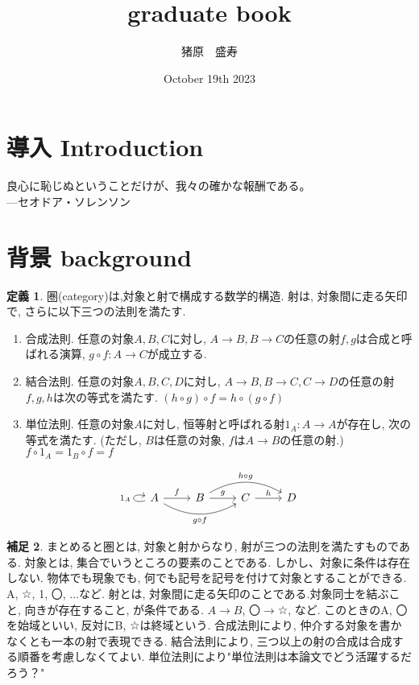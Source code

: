 \documentclass[a4paper]{jsarticle}
\title{graduate book}
\author{猪原　盛寿}
\date{October 19th 2023}
\theoremstyle{definition}
\newtheorem{dfn}{定義}[section]
\newtheorem{hsk}[dfn]{補足}
\begin{document}
\Large
\maketitle

\section{導入 Introduction}
良心に恥じぬということだけが、我々の確かな報酬である。\\
---セオドア・ソレンソン
\section{背景 background}

\begin{dfn}
圏(category)は,対象と射で構成する数学的構造. 射は, 対象間に走る矢印で, さらに以下三つの法則を満たす.
\begin{enumerate}[(1)]
    \item 合成法則. 任意の対象$A, B, C$に対し, $A\rightarrow B, B\rightarrow C$の任意の射$f, g$は合成と呼ばれる演算, $g \circ f: A\rightarrow C$が成立する.
    \item 結合法則. 任意の対象$A, B, C, D$に対し, $A\rightarrow B, B\rightarrow C, C\rightarrow D$の任意の射$f, g, h$は次の等式を満たす. $(h \circ g) \circ f = h \circ (g \circ f)$  
    \item 単位法則. 任意の対象$A$に対し, 恒等射と呼ばれる射$1_A:A\rightarrow A$が存在し, 次の等式を満たす. (ただし, $B$は任意の対象, $f$は$A\rightarrow B$の任意の射.) $f\circ 1_A = 1_B\circ f = f$  
\end{enumerate}
\end{dfn}
\begin{equation}
    \begin{tikzcd}
    A\ar{r}{f} \ar[loop left,"1_A"] \ar[bend right=30,swap]{rr}{g\circ f}& B\ar{r}{g} \ar[bend left=30]{rr}{h\circ g}& C\ar{r}{h} & D
\end{tikzcd}
\end{equation}

\begin{hsk}
まとめると圏とは, 対象と射からなり, 射が三つの法則を満たすものである.
対象とは, 集合でいうところの要素のことである. しかし、対象に条件は存在しない. 物体でも現象でも, 何でも記号を記号を付けて対象とすることができる. A, ☆, 1, 〇, ...など. 
射とは, 対象間に走る矢印のことである.対象同士を結ぶこと, 向きが存在すること, が条件である. $A \rightarrow B$, 〇$\rightarrow$☆, など. このときのA, 〇を始域といい, 反対にB, ☆は終域という.
合成法則により, 仲介する対象を書かなくとも一本の射で表現できる. 結合法則により, 三つ以上の射の合成は合成する順番を考慮しなくてよい. 単位法則により"単位法則は本論文でどう活躍するだろう？"\\
\end{hsk}
\end{document}
